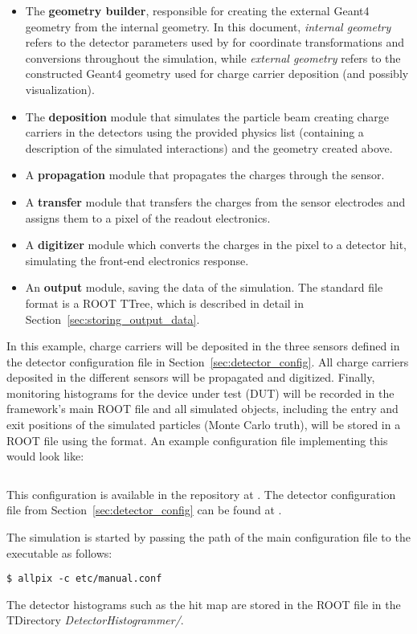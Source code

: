 \begin{itemize}
\begin{itemize}
\item The \textbf{geometry builder}, responsible for creating the external Geant4 geometry from the internal geometry.
In this document, \emph{internal geometry} refers to the detector parameters used by \apsq for coordinate transformations and conversions throughout the simulation, while \emph{external geometry} refers to the constructed Geant4 geometry used for charge carrier deposition (and possibly visualization).
\item The \textbf{deposition} module that simulates the particle beam creating charge carriers in the detectors using the provided physics list (containing a description of the simulated interactions) and the geometry created above.
\item A \textbf{propagation} module that propagates the charges through the sensor.
\item A \textbf{transfer} module that transfers the charges from the sensor electrodes and assigns them to a pixel of the readout electronics.
\item A \textbf{digitizer} module which converts the charges in the pixel to a detector hit, simulating the front-end electronics response.
\item An \textbf{output} module, saving the data of the simulation.
The \apsq standard file format is a ROOT TTree, which is described in detail in Section~\ref{sec:storing_output_data}.
\end{itemize}

In this example, charge carriers will be deposited in the three sensors defined in the detector configuration file in Section~\ref{sec:detector_config}.
All charge carriers deposited in the different sensors will be propagated and digitized.
Finally, monitoring histograms for the device under test (DUT) will be recorded in the framework's main ROOT file and all simulated objects, including the entry and exit positions of the simulated particles (Monte Carlo truth), will be stored in a ROOT file using the \apsq format.
An example configuration file implementing this would look like:
\inputminted[frame=single,framesep=3pt,breaklines=true,tabsize=2,linenos]{ini}{../../etc/manual.conf}

This configuration is available in the repository at .
The detector configuration file from Section~\ref{sec:detector_config} can be found at .

The simulation is started by passing the path of the main configuration file to the  executable as follows:
\begin{verbatim}
$ allpix -c etc/manual.conf
\end{verbatim}
The detector histograms such as the hit map are stored in the ROOT file  in the TDirectory \textit{DetectorHistogrammer/}.


\end{itemize}
